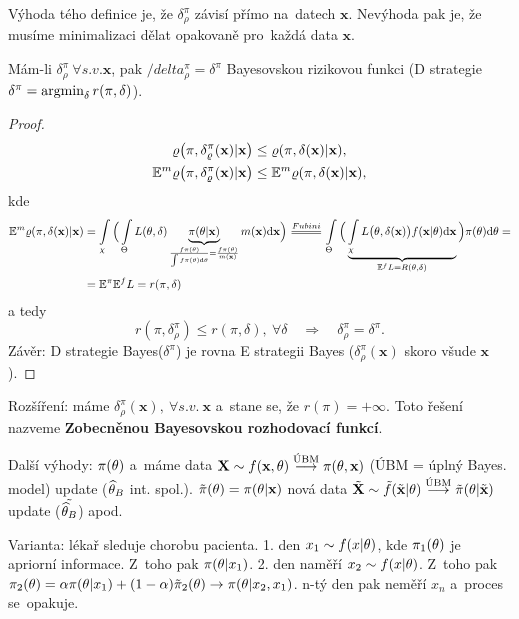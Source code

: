 \begin{remark}
	Výhoda tého definice je, že $\delta_\rho^\pi$ závisí přímo na~datech $\textbf{x}$. Nevýhoda pak je, že musíme minimalizaci dělat opakovaně pro~každá data $\textbf{x}$.
\end{remark}
\begin{theorem}
	Mám-li $\delta_\rho^\pi~\forall s.v.\textbf{x}$, pak $/delta_\rho^\pi=\delta^\pi$ Bayesovskou rizikovou funkci (D strategie $\delta^\pi=\mathop{\mathrm{argmin}}_\delta r(\pi,\delta)$).
	\begin{proof}
		\[
		\begin{split}
		\varrho\big(\pi,\delta_\varrho^\pi(\textbf{x})|\textbf{x}\big)&\leq \varrho(\pi,\delta(\textbf{x})|\textbf{x}), \\
		\mathbb{E}^m\varrho\big(\pi,\delta_\varrho^\pi(\textbf{x})|\textbf{x}\big)&\leq \mathbb{E}^m\varrho(\pi,\delta(\textbf{x})|\textbf{x}),
		\end{split}
		\]
		kde
			\[
		\begin{split}
	 \E^m\rho(\pi,\delta(\textbf{x})|\textbf{x})&=\int\limits_{\chi}\Big( \int\limits_{\Theta} L(\t,\delta)\underbrace{\pi(\t|\textbf{x})}_{\frac{f\pi(\t)}{\int f\pi(\t)\d\t}=\frac{f\pi(\t)}{m(\textbf{x})}}m(\textbf{x})\d\textbf{x}\Big)\equal{Fubini}\int\limits_{\Theta}\Big( \underbrace{\int\limits_{\chi} L\big(\t,\delta(\textbf{x})\big)f(\textbf{x}|\t)\d\textbf{x}}_{\E^f L=R(\t,\delta)} \Big)\pi(\t)\d\t=\\&=\E^\pi\E^f L=r(\pi,\delta) 
		\end{split}
		\]
		a tedy 
		$$ r(\pi,\delta_\rho^\pi)\leq r(\pi,\delta),~\forall\delta\quad \Rightarrow\quad \delta_\rho^\pi=\delta^\pi.$$
		Závěr: D strategie Bayes($\delta^\pi$) je rovna E strategii Bayes ($\delta_\rho^\pi(\textbf{x})$ skoro všude $\textbf{x}$).
	\end{proof} 
\end{theorem}
Rozšíření: máme $\delta_\rho^\pi(\textbf{x}),~\forall s.v.~ \textbf{x}$ a~stane se, že $r(\pi)=+\infty$. Toto řešení nazveme \textbf{Zobecněnou Bayesovskou rozhodovací funkcí}.

Další výhody: $\pi(\theta)$ a~máme data $\textbf{X}\sim f(\textbf{x},\theta)\stackrel{\text{ÚBM}}{\longrightarrow}\pi(\theta,\textbf{x})$ (ÚBM = úplný Bayes. model) update ($\widehat{\theta}_B$ int. spol.). $\tilde{\pi}(\theta)=\pi(\theta|\textbf{x})$ nová data $\tilde{\textbf{X}}\sim\tilde{f}(\tilde{\textbf{x}}|\theta)\stackrel{\text{ÚBM}}{\longrightarrow}\tilde{\pi}(\theta|\tilde{\textbf{x}})$ update ($\tilde{\widehat{\theta}_B}$) apod. 

\begin{example}
	Varianta: lékař sleduje chorobu pacienta. 1. den $x_1\sim f(x|\theta)$, kde $\pi_1(\theta)$ je apriorní informace. Z~toho pak $\pi(\theta|x_1)$. 2. den naměří $x_2\sim f(x|\theta)$. Z~toho pak $\pi_2(\theta)=\alpha\pi(\theta| x_1)+(1-\alpha)\tilde{\pi}_2(\theta)\to \pi(\theta|x_2,x_1)$. n-tý den pak neměří $x_n$ a~proces se~opakuje.
\end{example}
